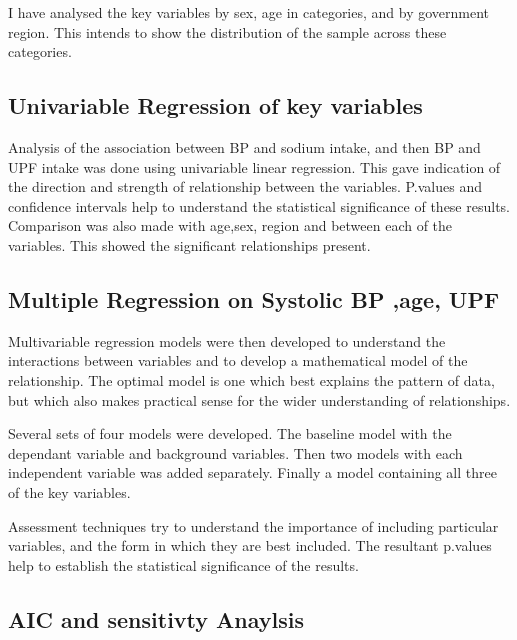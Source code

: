 \documentclass[
]{article}
\begin{document}
I have analysed the key variables by sex, age in categories, and by
government region. This intends to show the distribution of the sample
across these categories.

\hypertarget{univariable-regression-of-key-variables}{%
\subsection{Univariable Regression of key
variables}\label{univariable-regression-of-key-variables}}

Analysis of the association between BP and sodium intake, and then BP
and UPF intake was done using univariable linear regression. This gave
indication of the direction and strength of relationship between the
variables. P.values and confidence intervals help to understand the
statistical significance of these results. Comparison was also made with
age,sex, region and between each of the variables. This showed the
significant relationships present.

\hypertarget{multiple-regression-on-systolic-bp-age-upf}{%
\subsection{Multiple Regression on Systolic BP ,age,
UPF}\label{multiple-regression-on-systolic-bp-age-upf}}

Multivariable regression models were then developed to understand the
interactions between variables and to develop a mathematical model of
the relationship. The optimal model is one which best explains the
pattern of data, but which also makes practical sense for the wider
understanding of relationships.

Several sets of four models were developed. The baseline model with the
dependant variable and background variables. Then two models with each
independent variable was added separately. Finally a model containing
all three of the key variables.

Assessment techniques try to understand the importance of including
particular variables, and the form in which they are best included. The
resultant p.values help to establish the statistical significance of the
results.

\hypertarget{aic-and-sensitivty-anaylsis}{%
\subsection{AIC and sensitivty
Anaylsis}\label{aic-and-sensitivty-anaylsis}}
\end{document}
